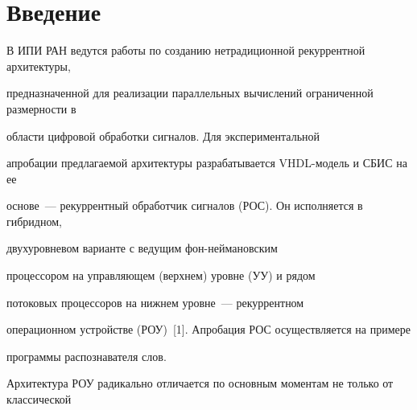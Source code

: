 




   










      \thispagestyle{headings}





      


            \label{st\stat}


            


            \vspace*{-12pt}





\section{Введение}


   


   В ИПИ РАН ведутся работы по созданию нетрадиционной рекуррентной архитектуры, 


предназначенной для реализации параллельных вычислений ограниченной размерности в 


области цифровой обработки сигналов. Для экспериментальной 


апробации предлагаемой архитектуры разрабатывается VHDL-мо\-дель и СБИС на ее 


основе~--- рекуррентный обработчик сигналов (РОС). Он исполняется в гибридном, 


двухуровневом варианте с ведущим    фон-ней\-ма\-нов\-ским 


процессором на управляющем (верхнем) уровне (УУ) и рядом 


потоковых процессоров на нижнем уровне~--- рекуррентном 


операционном устройстве (РОУ)~[1]. Апробация РОС осуществляется на примере 


программы распознавателя слов.


   


   Архитектура РОУ радикально отличается по основным моментам не только от классической 


